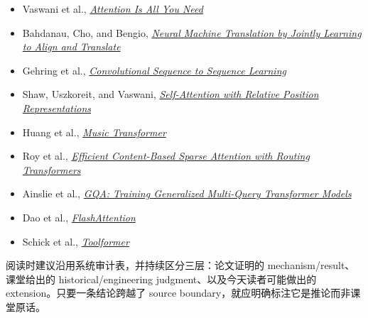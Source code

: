 \documentclass[a4paper]{article}
\begin{document}
\begingroup
\footnotesize
\begin{itemize}[itemsep=0pt,topsep=0.15em,parsep=0pt]
  \item Vaswani et al., \href{https://arxiv.org/abs/1706.03762}{\emph{Attention Is All You Need}}
  \item Bahdanau, Cho, and Bengio, \href{https://arxiv.org/abs/1409.0473}{\emph{Neural Machine Translation by Jointly Learning to Align and Translate}}
  \item Gehring et al., \href{https://arxiv.org/abs/1705.03122}{\emph{Convolutional Sequence to Sequence Learning}}
  \item Shaw, Uszkoreit, and Vaswani, \href{https://arxiv.org/abs/1803.02155}{\emph{Self-Attention with Relative Position Representations}}
  \item Huang et al., \href{https://arxiv.org/abs/1809.04281}{\emph{Music Transformer}}
  \item Roy et al., \href{https://arxiv.org/abs/2003.05997}{\emph{Efficient Content-Based Sparse Attention with Routing Transformers}}
  \item Ainslie et al., \href{https://arxiv.org/abs/2305.13245}{\emph{GQA: Training Generalized Multi-Query Transformer Models}}
  \item Dao et al., \href{https://arxiv.org/abs/2205.14135}{\emph{FlashAttention}}
  \item Schick et al., \href{https://arxiv.org/abs/2302.04761}{\emph{Toolformer}}
\end{itemize}

阅读时建议沿用系统审计表，并持续区分三层：论文证明的 mechanism/result、课堂给出的 historical/engineering judgment、以及今天读者可能做出的 extension。只要一条结论跨越了 source boundary，就应明确标注它是推论而非课堂原话。
\endgroup
\end{document}
